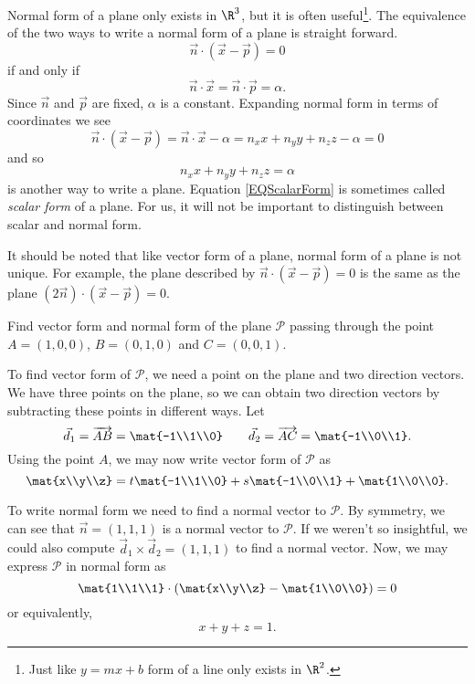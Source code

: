 Normal form of a plane only exists in $\R^3$, but it is often useful\footnote{ Just like $y=mx+b$ form
of a line only exists in $\R^2$.}.  The equivalence of the two ways to write a normal form of a plane
is straight forward.
\[
		\vec n\cdot(\vec x-\vec p)=0
\]
if and only if
\[
		\vec n\cdot\vec x = \vec n\cdot \vec p = \alpha.
\]
Since $\vec n$ and $\vec p$ are fixed, $\alpha$ is a constant. Expanding normal form in terms of
coordinates we see
\[
		\vec n\cdot(\vec x-\vec p)=\vec n\cdot\vec x-\alpha=
		n_xx+n_yy+n_zz-\alpha=0
\]
and so
\begin{equation}
	\label{EQScalarForm}
		n_xx+n_yy+n_zz=\alpha
\end{equation}
is another way to write a plane.  Equation \eqref{EQScalarForm} is sometimes
called \emph{scalar form}
of a plane.  For us, it will not be important to distinguish between scalar and normal form.

It should be noted that like vector form of a plane, normal form of a plane is not unique.
For example, the plane described by $\vec n\cdot(\vec x-\vec p)=0$ is the same as the
plane $(2\vec n)\cdot(\vec x-\vec p)=0$.

\begin{example}
	Find vector form and normal form of the plane $\mathcal P$ passing
	through the point $A=(1,0,0)$, $B=(0,1,0)$ and $C=(0,0,1)$.

	To find vector form of $\mathcal P$, we need a point on the plane and
	two direction vectors.  We have three points on the plane, so we can
	obtain two direction vectors by subtracting these points in different ways.
	Let
	\[
		\vec d_1=\overrightarrow{AB} = \mat{-1\\1\\0}\qquad\vec d_2=\overrightarrow{AC}=
		\mat{-1\\0\\1}.
	\]
	Using the point $A$, we may now write vector form of $\mathcal P$ as
	\[
		\mat{x\\y\\z} = t\mat{-1\\1\\0}+s\mat{-1\\0\\1}+\mat{1\\0\\0}.
	\]

	To write normal form we need to find a normal vector to $\mathcal P$.  By symmetry,
	we can see that $\vec n=(1,1,1)$ is a normal vector to $\mathcal P$.  If we weren't
	so insightful, we could also compute $\vec d_1\times \vec d_2 = (1,1,1)$ to find a
	normal vector.  Now, we may express $\mathcal P$ in normal form as
	\[
		\mat{1\\1\\1}\cdot\left(\mat{x\\y\\z}-\mat{1\\0\\0}\right)=0
	\]
	or equivalently,
	\[
		x+y+z=1.
	\]
\end{example}

